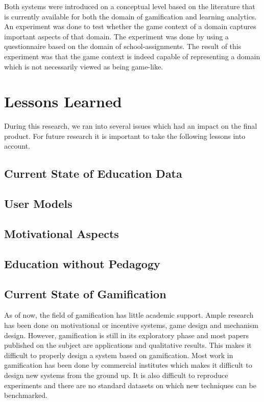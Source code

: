 \documentclass[11pt]{article}
\begin{document}
Both systems were introduced on a conceptual level based on the literature that is currently available for both the domain of gamification and learning analytics. An experiment was done to test whether the game context of a domain captures important aspects of that domain. The experiment was done by using a questionnaire based on the domain of school-assignments. The result of this experiment was that the game context is indeed capable of representing a domain which is not necessarily viewed as being game-like. 


\section{Lessons Learned}
During this research, we ran into several issues which had an impact on the final product. For future research it is important to take the following lessons into account.

\subsection{Current State of Education Data}

\subsection{User Models}


\subsection{Motivational Aspects}

\subsection{Education without Pedagogy}

\subsection{Current State of Gamification}
As of now, the field of gamification has little academic support. Ample research has been done on motivational or incentive systems, game design and mechanism design.
However, gamification is still in its exploratory phase and most papers published on the subject are applications and qualitative results. This makes it difficult to properly design a system based on gamification. Most work in gamification has been done by commercial institutes which makes it difficult to design new systems from the ground up. It is also difficult to reproduce experiments and there are no standard datasets on which new techniques can be benchmarked.
\end{document}
